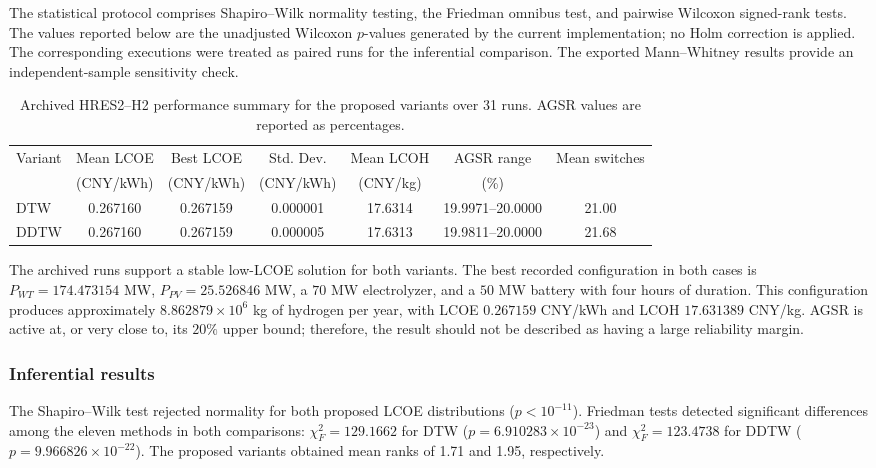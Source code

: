 The statistical protocol comprises Shapiro--Wilk normality testing, the Friedman omnibus test, and pairwise Wilcoxon signed-rank tests. The values reported below are the unadjusted Wilcoxon $p$-values generated by the current implementation; no Holm correction is applied. The corresponding executions were treated as paired runs for the inferential comparison. The exported Mann--Whitney results provide an independent-sample sensitivity check.

\begin{table}[htbp]
\centering
\scriptsize
\caption{Archived HRES2--H2 performance summary for the proposed variants over
31 runs. AGSR values are reported as percentages.}
\label{tab:hres2_revision_summary}
\begin{tabular}{lcccccc}
\toprule
Variant & Mean LCOE & Best LCOE & Std. Dev. & Mean LCOH & AGSR range & Mean switches \\
 & (CNY/kWh) & (CNY/kWh) & (CNY/kWh) & (CNY/kg) & (\%) & \\
\midrule
DTW  & 0.267160 & 0.267159 & 0.000001 & 17.6314 & 19.9971--20.0000 & 21.00 \\
DDTW & 0.267160 & 0.267159 & 0.000005 & 17.6313 & 19.9811--20.0000 & 21.68 \\
\bottomrule
\end{tabular}
\end{table}

The archived runs support a stable low-LCOE solution for both variants. The
best recorded configuration in both cases is $P_{WT}=174.473154$ MW,
$P_{PV}=25.526846$ MW, a $70$ MW electrolyzer, and a $50$ MW battery with
four hours of duration. This configuration produces approximately
$8.862879\times10^{6}$ kg of hydrogen per year, with LCOE
$0.267159$ CNY/kWh and LCOH $17.631389$ CNY/kg. AGSR is active at, or very
close to, its $20\%$ upper bound; therefore, the result should not be
described as having a large reliability margin.

\subsubsection{Inferential results}

The Shapiro--Wilk test rejected normality for both proposed LCOE distributions
($p<10^{-11}$). Friedman tests detected significant differences among the
eleven methods in both comparisons: $\chi_F^2=129.1662$ for DTW
($p=6.910283\times10^{-23}$) and $\chi_F^2=123.4738$ for DDTW
($p=9.966826\times10^{-22}$). The proposed variants obtained mean ranks of
1.71 and 1.95, respectively.


